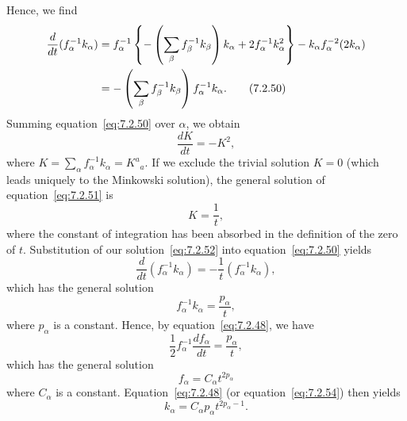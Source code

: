 Hence, we find
\begin{align}
  \frac{d}{dt}(f_\alpha^{-1}k_\alpha)
    &=f_\alpha^{-1}
      \left\{
        -\left(\sum_\beta f_\beta^{-1}k_\beta\right)k_\alpha
        +2f_\alpha^{-1}k_\alpha^2
      \right\}
      -k_\alpha f_\alpha^{-2}(2k_\alpha) \notag\\
    &=-\left(\sum_\beta f_\beta^{-1}k_\beta\right)
      f_\alpha^{-1}k_\alpha .
  \tag{7.2.50}\label{eq:7.2.50}
\end{align}
Summing equation~\eqref{eq:7.2.50} over \(\alpha\), we obtain
\begin{equation}
  \frac{dK}{dt}=-K^2 ,
  \tag{7.2.51}\label{eq:7.2.51}
\end{equation}
where \(K=\sum_\alpha f_\alpha^{-1}k_\alpha=K^a{}_a\). If we exclude the
trivial solution \(K=0\) (which leads uniquely to the Minkowski solution), the
general solution of equation~\eqref{eq:7.2.51} is
\begin{equation}
  K=\frac1t ,
  \tag{7.2.52}\label{eq:7.2.52}
\end{equation}
where the constant of integration has been absorbed in the definition of the zero of
\(t\). Substitution of our solution~\eqref{eq:7.2.52} into
equation~\eqref{eq:7.2.50} yields
\begin{equation}
  \frac{d}{dt}(f_\alpha^{-1}k_\alpha)
    =-\frac1t(f_\alpha^{-1}k_\alpha) ,
  \tag{7.2.53}\label{eq:7.2.53}
\end{equation}
which has the general solution
\begin{equation}
  f_\alpha^{-1}k_\alpha=\frac{p_\alpha}{t} ,
  \tag{7.2.54}\label{eq:7.2.54}
\end{equation}
where \(p_\alpha\) is a constant. Hence, by equation~\eqref{eq:7.2.48}, we have
\begin{equation}
  \frac12f_\alpha^{-1}\frac{df_\alpha}{dt}
    =\frac{p_\alpha}{t} ,
  \tag{7.2.55}\label{eq:7.2.55}
\end{equation}
which has the general solution
\begin{equation}
  f_\alpha=C_\alpha t^{2p_\alpha}
  \tag{7.2.56}\label{eq:7.2.56}
\end{equation}
where \(C_\alpha\) is a constant. Equation~\eqref{eq:7.2.48} (or
equation~\eqref{eq:7.2.54}) then yields
\begin{equation}
  k_\alpha=C_\alpha p_\alpha t^{2p_\alpha-1} .
  \tag{7.2.57}\label{eq:7.2.57}
\end{equation}
